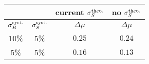\begin{tabular}{cc|c|c}
  \multicolumn{2}{c}{}                            & \multicolumn{1}{c|}{current $\sigma_S^{\text{theo.}}$} & \multicolumn{1}{c}{no $\sigma_S^{\text{theo.}}$} \\ 
  \hline \hline
  $\sigma_{B}^{\text{syst.}}$ & $\sigma_S^{\text{syst.}}$ & $\Delta\mu$ & $\Delta\mu$ \\ 
  \hline
  10\%                    &  5\%                  & $0.25$      & $0.24$      \\
  5\%                     &  5\%                  & $0.16$      & $0.13$      \\ 
  \hline
\end{tabular}


